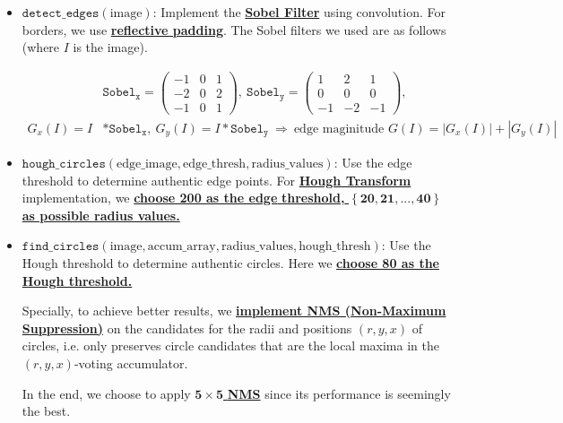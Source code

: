\documentclass{article}
\newcommand{\set}[1]{\left\{#1\right\}}
\begin{document}
\begin{itemize}
    \item $\mathtt{detect\_edges}(\mathrm{image})$: Implement the \textbf{\underline{Sobel Filter}} using convolution. For borders, we use \textbf{\underline{reflective padding}}. The Sobel filters we used are as follows (where $I$ is the image). 
    
    \vspace{-2.5em}
    \begin{align*}
        &\mathtt{Sobel_x} = \left(
        \begin{array}{rrr}
            -1 & 0 & 1 \\
            -2 & 0 & 2 \\
            -1 & 0 & 1 
        \end{array}\right),\ \mathtt{Sobel_y} = \left(
            \begin{array}{rrr}
                1 & 2 & 1 \\
                0 & 0 & 0 \\
                -1 & -2 & -1 
            \end{array}\right),\\
        G_x(I) = I &* \mathtt{Sobel_x},\ G_y(I)= I * \mathtt{Sobel_y}\ \Longrightarrow\ \text{edge maginitude }G(I) = |G_x(I)|+|G_y(I)|
    \end{align*}

    \vspace{-1.75em}
    \item $\mathtt{hough\_circles}\mathrm{(edge\_image, edge\_thresh, radius\_values)}$:
    Use the edge threshold to determine authentic edge points. For \textbf{\underline{Hough Transform}} implementation, we \underline{\textbf{choose 200 as the edge }} \underline{\textbf{threshold,} $\boldsymbol{\set{20,21,...,40}}$ \textbf{as possible radius values.}}
    
    \item $\mathtt{find\_circles}\mathrm{(image, accum\_array, radius\_values, hough\_thresh)}$: Use the Hough threshold to determine authentic circles. Here we \textbf{\underline{choose 80 as the Hough threshold.}}
    
    Specially, to achieve better results, we \textbf{\underline{implement NMS (Non-Maximum Suppression)}} on the candidates for the radii and positions $(r,y,x)$ of circles, i.e. only preserves circle candidates that are the local maxima in the $(r,y,x)$-voting accumulator.

    In the end, we choose to apply \underline{$\boldsymbol{5\times 5}$ \textbf{NMS}} since its performance is seemingly the best.
\end{itemize}
\end{document}
